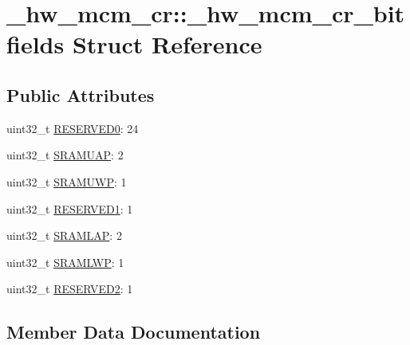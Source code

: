 \hypertarget{struct__hw__mcm__cr_1_1__hw__mcm__cr__bitfields}{}\section{\+\_\+hw\+\_\+mcm\+\_\+cr\+:\+:\+\_\+hw\+\_\+mcm\+\_\+cr\+\_\+bitfields Struct Reference}
\label{struct__hw__mcm__cr_1_1__hw__mcm__cr__bitfields}
\subsection*{Public Attributes}
\begin{DoxyCompactItemize}
\item 
uint32\+\_\+t \hyperlink{struct__hw__mcm__cr_1_1__hw__mcm__cr__bitfields_a0b5e8ce4e48054e6e05166bf4b29753a}{R\+E\+S\+E\+R\+V\+E\+D0}\+: 24
\item 
uint32\+\_\+t \hyperlink{struct__hw__mcm__cr_1_1__hw__mcm__cr__bitfields_a0d926395c7b1b871d1fac8f06fd028c2}{S\+R\+A\+M\+U\+AP}\+: 2
\item 
uint32\+\_\+t \hyperlink{struct__hw__mcm__cr_1_1__hw__mcm__cr__bitfields_a95572a8cec506ff6be027299a5f1ac77}{S\+R\+A\+M\+U\+WP}\+: 1
\item 
uint32\+\_\+t \hyperlink{struct__hw__mcm__cr_1_1__hw__mcm__cr__bitfields_aae50733724e4f51aea38699e4e35fb43}{R\+E\+S\+E\+R\+V\+E\+D1}\+: 1
\item 
uint32\+\_\+t \hyperlink{struct__hw__mcm__cr_1_1__hw__mcm__cr__bitfields_afd7da20660013572c37d794c0149fa4c}{S\+R\+A\+M\+L\+AP}\+: 2
\item 
uint32\+\_\+t \hyperlink{struct__hw__mcm__cr_1_1__hw__mcm__cr__bitfields_ae38f7a97c987ba53a7cf8308b0f41c3b}{S\+R\+A\+M\+L\+WP}\+: 1
\item 
uint32\+\_\+t \hyperlink{struct__hw__mcm__cr_1_1__hw__mcm__cr__bitfields_a829f37f6c6d2eb4ee1853435f9e1b532}{R\+E\+S\+E\+R\+V\+E\+D2}\+: 1
\end{DoxyCompactItemize}


\subsection{Member Data Documentation}
